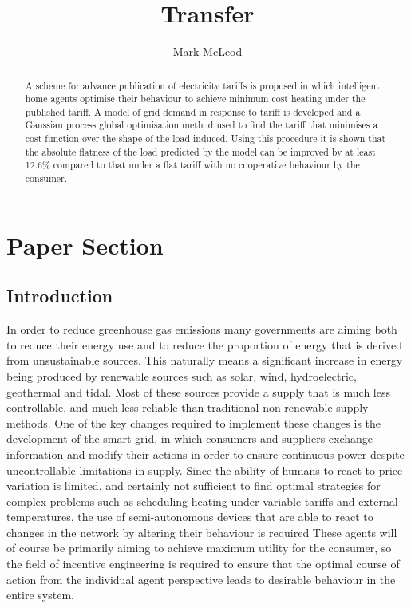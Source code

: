 \documentclass[a4paper, 10 pt, conference]{ieeeconf}  %
\title{\LARGE \bf Transfer}
\author{Mark McLeod}
\date{}
\begin{document}
\maketitle
\thispagestyle{empty}
\pagestyle{empty}

\section{Paper Section}
\begin{abstract}
A scheme for advance publication of electricity tariffs is proposed in which intelligent home agents optimise their behaviour to achieve minimum cost heating under the published tariff. A model of grid demand in response to tariff is developed and a Gaussian process global optimisation method used to find the tariff that minimises a cost function over the shape of the load induced. Using this procedure it is shown that the absolute flatness of the load predicted by the model can be improved by at least 12.6\% compared to that under a flat tariff with no cooperative behaviour by the consumer.
\end{abstract}

\subsection{Introduction}

In order to reduce greenhouse gas emissions many governments are aiming both to reduce their energy use and to reduce the proportion of energy that is derived from unsustainable sources. This naturally means a significant increase in energy being produced by renewable sources such as solar, wind, hydroelectric, geothermal and tidal. Most of these sources provide a supply that is much less controllable, and much less reliable than traditional non-renewable supply methods. One of the key changes required to implement these changes is the development of the smart grid, in which consumers and suppliers exchange information and modify their actions in order to ensure continuous power despite uncontrollable limitations in supply. Since the ability of humans to react to price variation is limited, and certainly not sufficient to find optimal strategies for complex problems such as scheduling heating under variable tariffs and external temperatures, the use of semi-autonomous devices that are able to react to changes in the network by altering their behaviour is required \cite{rogers2012delivering} These agents will of course be primarily aiming to achieve maximum utility for the consumer, so the field of incentive engineering is required to ensure that the optimal course of action from the individual agent perspective leads to desirable behaviour in the entire system.
\end{document}
